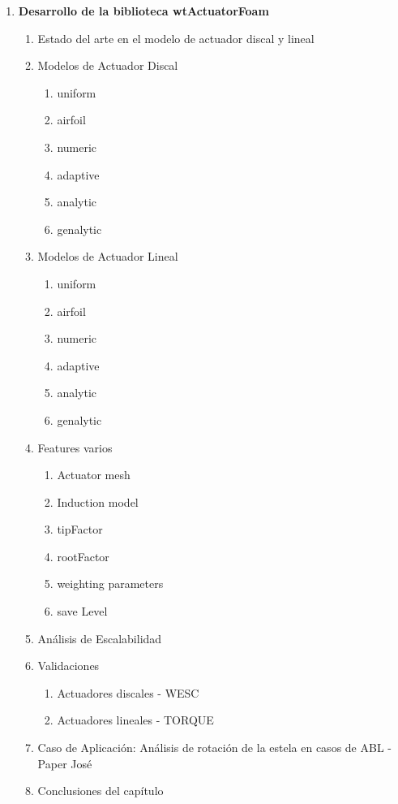 \begin{enumerate}
  \item \textbf{Desarrollo de la biblioteca wtActuatorFoam}
  \begin{enumerate}[label*=\arabic*.]
  	\item Estado del arte en el modelo de actuador discal y lineal
    \item Modelos de Actuador Discal
    \begin{enumerate}[label*=\arabic*.]
    		\item uniform
    		\item airfoil
    		\item numeric
    		\item adaptive
    		\item analytic
		\item genalytic
    \end{enumerate}
    \item Modelos de Actuador Lineal
    \begin{enumerate}[label*=\arabic*.]
    		\item uniform
    		\item airfoil
    		\item numeric
    		\item adaptive
    		\item analytic
		\item genalytic
	\end{enumerate}
     \item{Features varios}
    	\begin{enumerate}[label*=\arabic*.]
    			\item Actuator mesh
    			\item Induction model
    			\item tipFactor
    			\item rootFactor
    			\item weighting parameters
    			\item save Level
    	\end{enumerate}
    	\item Análisis de Escalabilidad
    	\item Validaciones
    	\begin{enumerate}[label*=\arabic*.]
    		\item Actuadores discales - WESC
    		\item Actuadores lineales - TORQUE
    	\end{enumerate}
    	\item Caso de Aplicación: Análisis de rotación de la estela en casos de ABL - Paper José
	\item Conclusiones del capítulo
  \end{enumerate}


\end{enumerate}
